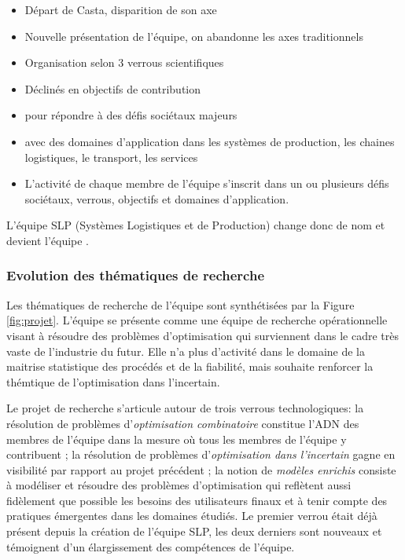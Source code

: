 		\begin{itemize}
			\item Départ de Casta, disparition de son axe
			\item Nouvelle présentation de l'équipe, on abandonne les axes traditionnels
			\item Organisation selon 3 verrous scientifiques 
			\item Déclinés en objectifs de contribution
			\item pour répondre à des défis sociétaux majeurs
			\item avec des domaines d'application dans les systèmes de production, les chaines logistiques, le transport, les services
			\item L'activité de chaque membre de l'équipe s'inscrit dans un ou plusieurs défis sociétaux, verrous, objectifs et domaines d'application. 
		\end{itemize}
		
		L'équipe SLP (Systèmes Logistiques et de Production) change donc de nom et devient l'équipe \slp. 
		
		
		
		\subsubsection{Evolution des thématiques de recherche}
		
		Les thématiques de recherche de l'équipe \slp sont synthétisées par la Figure \ref{fig:projet}. 
		L'équipe se présente comme une équipe de recherche opérationnelle visant à résoudre des problèmes d'optimisation qui surviennent dans le cadre très vaste de l'industrie du futur. Elle n'a plus d'activité dans le domaine de la maitrise statistique des procédés et de la fiabilité, mais souhaite renforcer la thémtique de l'optimisation dans l'incertain.
		
		Le projet de recherche s'articule autour de trois verrous technologiques:  
	la résolution de problèmes d'\textit{optimisation combinatoire} constitue l'ADN des membres de l'équipe \slp dans la mesure où tous les membres de l'équipe y contribuent ; 
	la résolution de problèmes d'\textit{optimisation dans l'incertain} gagne en visibilité par rapport au projet précédent  ;
	la notion de \textit{modèles enrichis} consiste à modéliser et résoudre des problèmes d'optimisation qui reflètent aussi fidèlement que possible les besoins des utilisateurs finaux et à tenir compte des pratiques émergentes dans les domaines étudiés. Le premier verrou était déjà présent depuis la création de l'équipe SLP, les deux derniers sont nouveaux et témoignent d'un élargissement des compétences de l'équipe.
	

